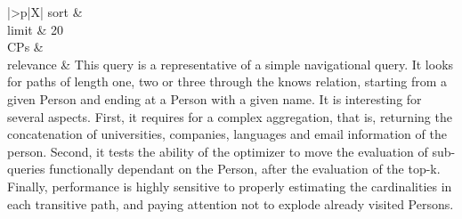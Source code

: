 \begin{tabularx}{\queryCardWidth}{|>{\queryPropertyCell}p{\queryPropertyCellWidth}|X|}
		sort		&
		\innerCardVSpace \\ \hline
	limit & 20 \\ \hline
	CPs &
	 \\ \hline
	relevance &
		\small This query is a representative of a simple navigational query. It looks for paths of length one, two or three through
the knows relation, starting from a given Person and ending at a Person with a given name. It is interesting for several
aspects. First, it requires for a complex aggregation, that is, returning the concatenation of universities, companies,
languages and email information of the person. Second, it tests the ability of the optimizer to move the evaluation of
sub-queries functionally dependant on the Person, after the evaluation of the top-k. Finally, performance is
highly sensitive to properly estimating the cardinalities in each transitive path, and paying attention not to explode
already visited Persons.
 \\ \hline%
\end{tabularx}
\queryCardVSpace

\renewcommand{\emph}[1]{\oldemph{#1}}